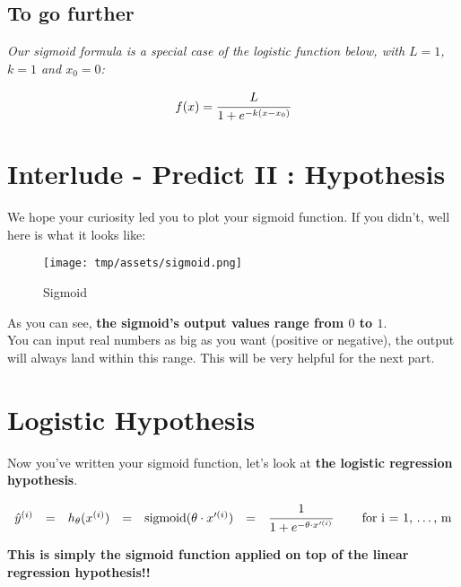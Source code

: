 \documentclass[]{article}
\begin{document}
\hypertarget{to-go-further}{%
\subsection{To go further}\label{to-go-further}}

\emph{Our sigmoid formula is a special case of the logistic function
below, with \(L = 1\), \(k = 1\) and \(x_0 = 0\):}

\large

\[
f(x) = \cfrac{L}{1 + e^{-k(x-x_0)}}
\] \normalsize

\clearpage

\hypertarget{interlude---predict-ii-hypothesis-1}{%
\section{Interlude - Predict II :
Hypothesis}\label{interlude---predict-ii-hypothesis-1}}

We hope your curiosity led you to plot your sigmoid function. If you
didn't, well here is what it looks like:

\begin{figure}
\centering
\texttt{[image: tmp/assets/sigmoid.png]}
\caption{Sigmoid}
\end{figure}

As you can see, \textbf{the sigmoid's output values range from \(0\) to
\(1\)}.\\
You can input real numbers as big as you want (positive or negative),
the output will always land within this range. This will be very helpful
for the next part.

\hypertarget{logistic-hypothesis}{%
\section{Logistic Hypothesis}\label{logistic-hypothesis}}

Now you've written your sigmoid function, let's look at \textbf{the
logistic regression hypothesis}.

\large

\[
\begin{matrix}
\hat{y}^{(i)} & = & h_\theta(x^{(i)}) & = & \text{sigmoid}(\theta \cdot x'^{(i)}) 
& =  &\cfrac{1} {1 + e^{-\theta \cdot x'^{(i)}}} & &\text{ for i = 1, \dots, m}    
\end{matrix}
\] \normalsize

\textbf{This is simply the sigmoid function applied on top of the linear
regression hypothesis!!}
\end{document}
